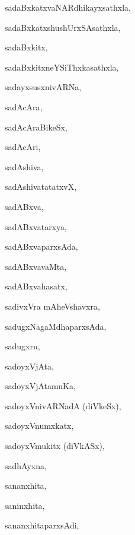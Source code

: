 \begin{multicols}{3}
{\noindent
{sadaBxkatxvaNARdhikayxsathxla}, \pageref{sadaBxkatxvaNARdhikayxsathxla}

\noindent
{sadaBxkatxshushUrxSAsathxla}, \pageref{sadaBxkatxshushUrxSAsathxla}

\noindent
{sadaBxkitx}, \pageref{sadaBxkitx}

\noindent
{sadaBxkitxneYSiThxkasathxla}, \pageref{sadaBxkitxneYSiThxkasathxla}

\noindent
{sadayxsusxnivARNa}, \pageref{sadayxsusxnivARNa}

\noindent
{sadAcAra}, \pageref{sadAcAra}

\noindent
{sadAcAraBikeSx}, \pageref{sadAcAraBikeSx}

\noindent
{sadAcAri}, \pageref{sadAcAri}

\noindent
{sadAshiva}, \pageref{sadAshiva}

\noindent
{sadAshivatatatxvX}, \pageref{sadAshivatatatxvX}

\noindent
{sadABxva}, \pageref{sadABxva}

\noindent
{sadABxvatarxya}, \pageref{sadABxvatarxya}

\noindent
{sadABxvaparxsAda}, \pageref{sadABxvaparxsAda}

\noindent
{sadABxvavaMta}, \pageref{sadABxvavaMta}

\noindent
{sadABxvahasatx}, \pageref{sadABxvahasatx}

\noindent
{sadivxVra mAheVshavxra}, \pageref{sadivxVramAheVshavxra}

\noindent
{sadugxNagaMdhaparxsAda}, \pageref{sadugxNagaMdhaparxsAda}

\noindent
{sadugxru}, \pageref{sadugxru}

\noindent
{sadoyxVjAta}, \pageref{sadoyxVjAta}

\noindent
{sadoyxVjAtamuKa}, \pageref{sadoyxVjAtamuKa}

\noindent
{sadoyxVnivARNadA (diVkeSx)}, \pageref{sadoyxVnivARNadAdiVkeSx}

\noindent
{sadoyxVnumxkatx}, \pageref{sadoyxVnumxkatx}

\noindent
{sadoyxVmukitx (diVkASx)}, \pageref{sadoyxVmukitxdiVkASx}

\noindent
{sadhAyxna}, \pageref{sadhAyxna}

\noindent
{sananxhita}, \pageref{sananxhita}

\noindent
{saninxhita}, \pageref{saninxhita}

\noindent
{sananxhitaparxsAdi}, \pageref{sananxhitaparxsAdi}

}
\end{multicols}
